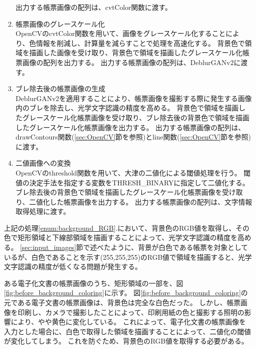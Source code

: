 \begin{enumerate}
        出力する帳票画像の配列は、cvtColor関数に渡す。
    \item 帳票画像のグレースケール化\\
        OpenCVのcvtColor関数を用いて、画像をグレースケール化することにより、色情報を削減し、計算量を減らすことで処理を高速化する。
        背景色で領域を描画した画像を受け取り、背景色で領域を描画したグレースケール化帳票画像の配列を出力する。
        出力する帳票画像の配列は、DeblurGANv2に渡す。   
    \item ブレ除去後の帳票画像の生成\\
        DeblurGANv2を適用することにより、帳票画像を撮影する際に発生する画像内のブレを除去し、光学文字認識の精度を高める。
        背景色で領域を描画したグレースケール化帳票画像を受け取り、ブレ除去後の背景色で領域を描画したグレースケール化帳票画像を出力する。
        出力する帳票画像の配列は、drawContours関数(\ref{sec:OpenCV}節を参照)とline関数(\ref{sec:OpenCV}節を参照)に渡す。
    \item 二値画像への変換\\
        OpenCVのthreshold関数を用いて、大津の二値化による閾値処理を行う。
        閾値の決定手法を指定する変数をTHRESH\_BINARYに指定して二値化する。
        ブレ除去後の背景色で領域を描画したグレースケール化帳票画像を受け取り、二値化した帳票画像を出力する。
        出力する帳票画像の配列は、文字情報取得処理に渡す。
\end{enumerate}

上記の処理\ref{enum:background_RGB}.において、背景色のRGB値を取得し、その色で矩形領域と下線部領域を描画することによって、光学文字認識の精度を高める。
\ref{sec:input_images}節で述べたように、背景が白色である帳票を対象としているが、白色であることを示す(255,255,255)のRGB値で領域を描画すると、光学文字認識の精度が低くなる問題が発生する。

ある電子化文書の帳票画像のうち、矩形領域の一部を、図\ref{fig:before_background_coloring}に示す。
図\ref{fig:before_background_coloring}の元である電子文書の帳票画像は、背景色は完全な白色だった。
しかし、帳票画像を印刷し、カメラで撮影したことによって、印刷用紙の色と撮影する照明の影響により、やや黄色に変化している。
これによって、電子化文書の帳票画像を入力とした場合に、白色で取得した領域を描画することによって、二値化の閾値が変化してしまう。
これを防ぐため、背景色のRGB値を取得する必要がある。

